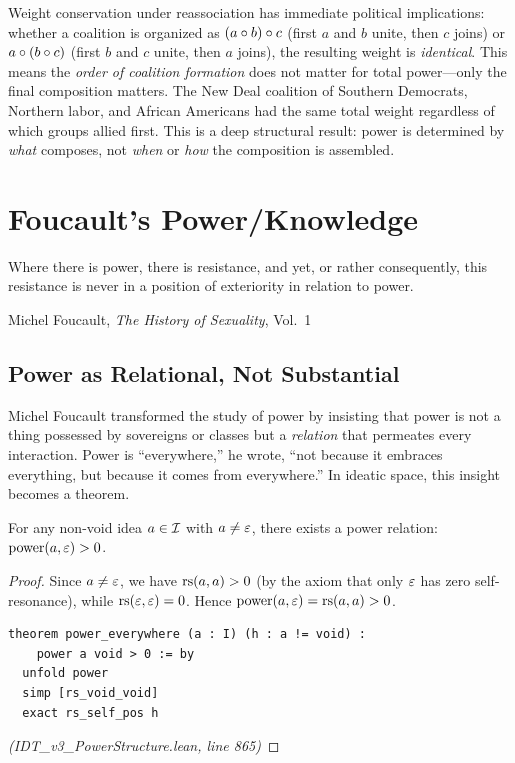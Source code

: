 \begin{interpretation}
Weight conservation under reassociation has immediate political implications:
whether a coalition is organized as $(a \circ b) \circ c$ (first $a$ and
$b$ unite, then $c$ joins) or $a \circ (b \circ c)$ (first $b$ and $c$
unite, then $a$ joins), the resulting weight is \emph{identical}. This means
the \emph{order of coalition formation} does not matter for total power---only
the final composition matters. The New Deal coalition of Southern Democrats,
Northern labor, and African Americans had the same total weight regardless of
which groups allied first. This is a deep structural result: power is
determined by \emph{what} composes, not \emph{when} or \emph{how} the
composition is assembled.
\end{interpretation}


\chapter{Foucault's Power/Knowledge}
\label{ch:foucault}

\epigraph{Where there is power, there is resistance, and yet, or rather consequently, this resistance is never in a position of exteriority in relation to power.}{Michel Foucault, \textit{The History of Sexuality}, Vol.~1}

\section{Power as Relational, Not Substantial}

Michel Foucault transformed the study of power by insisting that power is not a
thing possessed by sovereigns or classes but a \emph{relation} that permeates
every interaction. Power is ``everywhere,'' he wrote, ``not because it embraces
everything, but because it comes from everywhere.'' In ideatic space, this
insight becomes a theorem.

\begin{theorem}
\label{thm:power-everywhere}
For any non-void idea $a \in \mathcal{I}$ with $a \neq \varepsilon$, there exists a power
relation: $\mathrm{power}(a, \varepsilon) > 0$.
\end{theorem}

\begin{proof}
Since $a \neq \varepsilon$, we have $\mathrm{rs}(a,a) > 0$ (by the axiom that only $\varepsilon$
has zero self-resonance), while $\mathrm{rs}(\varepsilon, \varepsilon) = 0$. Hence
$\mathrm{power}(a, \varepsilon) = \mathrm{rs}(a,a) > 0$.
\begin{lstlisting}
theorem power_everywhere (a : I) (h : a != void) :
    power a void > 0 := by
  unfold power
  simp [rs_void_void]
  exact rs_self_pos h
\end{lstlisting}
\textit{(IDT\_v3\_PowerStructure.lean, line 865)}
\end{proof}

